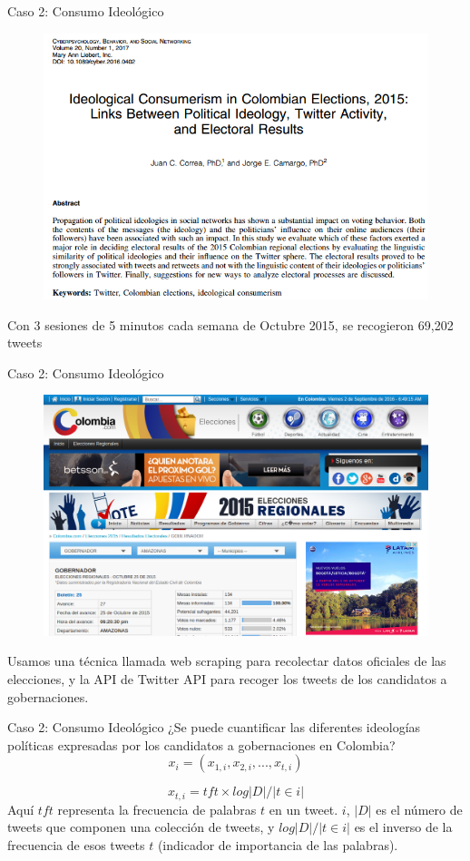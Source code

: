 \documentclass{beamer}
\begin{document}
\begin{frame}{Caso 2: Consumo Ideológico}
\begin{figure}
\centering
 \includegraphics[width=.75\textwidth]{paper}
\end{figure}    
Con 3 sesiones de 5 minutos cada semana de Octubre 2015, se recogieron 69,202 tweets  \cite{Correa2017}
\end{frame}

\begin{frame}{Caso 2: Consumo Ideológico}
\begin{figure}
\centering
 \includegraphics[width=.5\textwidth]{art3.png}
\end{figure}
Usamos una técnica llamada web scraping \cite{Munzert2014} para recolectar datos oficiales de las elecciones, y la API de Twitter API para recoger los tweets de los candidatos a gobernaciones.
\end{frame}

\begin{frame}{Caso 2: Consumo Ideológico}
¿Se puede cuantificar las diferentes ideologías políticas expresadas por los candidatos a gobernaciones en Colombia? 
\begin{equation}
    x_i = (x_{1,i}, x_{2,i}, ..., x_{t, i})
\end{equation}

\begin{equation}
    x_{t, i} = tft \times log|D| / |t \in i|
\end{equation}
Aquí $tft$ representa la frecuencia de palabras $t$ en un tweet.
$i$, $|D|$ es el número de tweets que componen una colección de tweets, y $log|D| / |t \in i|$ es el inverso de la frecuencia de esos tweets $t$ (indicador de importancia de las palabras).
\end{frame}
\end{document}
